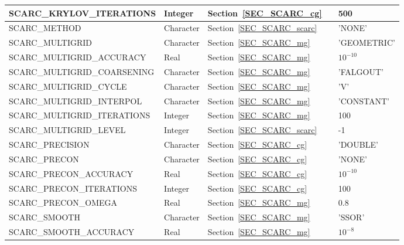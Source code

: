 \begin{longtable}{@{\extracolsep{\fill}}|l|l|l|l|l|}
{\ct SCARC\_KRYLOV\_ITERATIONS}     & Integer           & Section~\ref{SEC_SCARC_cg}  & &  500                 \\ \hline
{\ct SCARC\_METHOD}                             & Character      & Section~\ref{SEC_SCARC_scarc}  & &  {\ct 'NONE'}        \\ \hline
{\ct SCARC\_MULTIGRID}                         & Character      & Section~\ref{SEC_SCARC_mg}  & &  {\ct 'GEOMETRIC'}   \\ \hline
{\ct SCARC\_MULTIGRID\_ACCURACY}   & Real             & Section~\ref{SEC_SCARC_mg}  & &  $10^{-10}$          \\ \hline
{\ct SCARC\_MULTIGRID\_COARSENING} & Character   & Section~\ref{SEC_SCARC_mg}  & &  {\ct 'FALGOUT'}     \\ \hline
{\ct SCARC\_MULTIGRID\_CYCLE}            & Character     & Section~\ref{SEC_SCARC_mg}  & &  {\ct 'V'}           \\ \hline
{\ct SCARC\_MULTIGRID\_INTERPOL}      & Character     & Section~\ref{SEC_SCARC_mg}  & &  {\ct 'CONSTANT'}    \\ \hline
{\ct SCARC\_MULTIGRID\_ITERATIONS}   & Integer         & Section~\ref{SEC_SCARC_mg}  & &  100                 \\ \hline
{\ct SCARC\_MULTIGRID\_LEVEL}             & Integer         & Section~\ref{SEC_SCARC_scarc}  & &  -1                  \\ \hline
{\ct SCARC\_PRECISION}                          & Character      & Section~\ref{SEC_SCARC_cg}  & &  {\ct 'DOUBLE'}      \\ \hline
{\ct SCARC\_PRECON}                              & Character      & Section~\ref{SEC_SCARC_cg}  & &  {\ct 'NONE'}        \\ \hline
{\ct SCARC\_PRECON\_ACCURACY}      & Real              & Section~\ref{SEC_SCARC_cg}  & &  $10^{-10}$          \\ \hline
{\ct SCARC\_PRECON\_ITERATIONS}     & Integer           & Section~\ref{SEC_SCARC_cg}  & &  100                 \\ \hline
{\ct SCARC\_PRECON\_OMEGA}            & Real              & Section~\ref{SEC_SCARC_mg}  & &  0.8                 \\ \hline
{\ct SCARC\_SMOOTH}                            & Character       & Section~\ref{SEC_SCARC_mg}  & &  {\ct 'SSOR'}        \\ \hline
{\ct SCARC\_SMOOTH\_ACCURACY}      & Real              & Section~\ref{SEC_SCARC_mg}  & &  $10^{-8}$           \\ \hline

\end{longtable}
